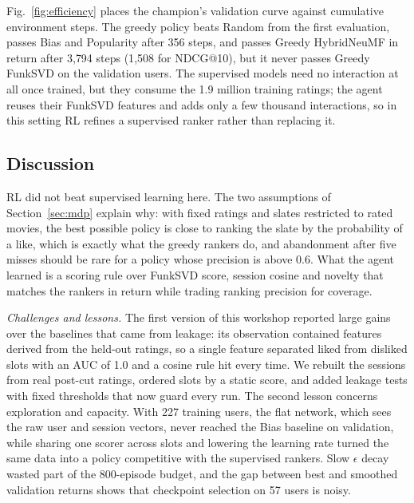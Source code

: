Fig.~\ref{fig:efficiency} places the champion's validation curve against cumulative environment steps. The greedy policy beats Random from the first evaluation, passes Bias and Popularity after 356 steps, and passes Greedy HybridNeuMF in return after 3{,}794 steps (1{,}508 for NDCG@10), but it never passes Greedy FunkSVD on the validation users. The supervised models need no interaction at all once trained, but they consume the 1.9 million training ratings; the agent reuses their FunkSVD features and adds only a few thousand interactions, so in this setting RL refines a supervised ranker rather than replacing it.

\subsection{Discussion}
\label{sec:discussion}

RL did not beat supervised learning here. The two assumptions of Section~\ref{sec:mdp} explain why: with fixed ratings and slates restricted to rated movies, the best possible policy is close to ranking the slate by the probability of a like, which is exactly what the greedy rankers do, and abandonment after five misses should be rare for a policy whose precision is above 0.6. What the agent learned is a scoring rule over FunkSVD score, session cosine and novelty that matches the rankers in return while trading ranking precision for coverage.

\emph{Challenges and lessons.}
\label{sec:challenges}
The first version of this workshop reported large gains over the baselines that came from leakage: its observation contained features derived from the held-out ratings, so a single feature separated liked from disliked slots with an AUC of 1.0 and a cosine rule hit every time. We rebuilt the sessions from real post-cut ratings, ordered slots by a static score, and added leakage tests with fixed thresholds that now guard every run. The second lesson concerns exploration and capacity. With 227 training users, the flat network, which sees the raw user and session vectors, never reached the Bias baseline on validation, while sharing one scorer across slots and lowering the learning rate turned the same data into a policy competitive with the supervised rankers. Slow $\epsilon$ decay wasted part of the 800-episode budget, and the gap between best and smoothed validation returns shows that checkpoint selection on 57 users is noisy.
